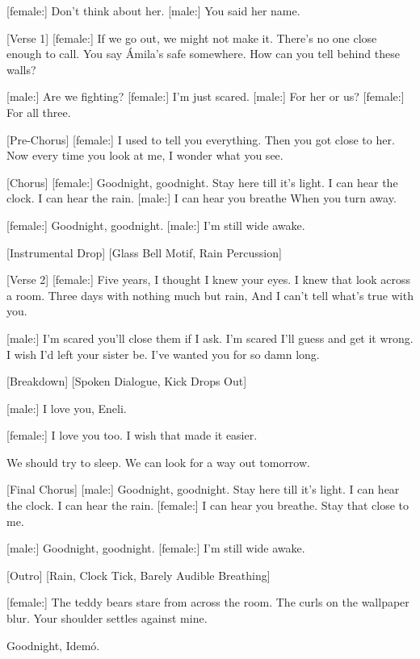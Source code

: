 \begin{lyrics}

[female:]
Don’t think about her.
[male:]
You said her name.

[Verse 1]
[female:]
If we go out, we might not make it.
There’s no one close enough to call.
You say Ámila’s safe somewhere.
How can you tell behind these walls?

[male:]
Are we fighting?
[female:]
I’m just scared.
[male:]
For her or us?
[female:]
For all three.

[Pre-Chorus]
[female:]
I used to tell you everything.
Then you got close to her.
Now every time you look at me,
I wonder what you see.

[Chorus]
[female:]
Goodnight, goodnight.
Stay here till it’s light.
I can hear the clock.
I can hear the rain.
[male:]
I can hear you breathe
When you turn away.

[female:]
Goodnight, goodnight.
[male:]
I’m still wide awake.

[Instrumental Drop]
[Glass Bell Motif, Rain Percussion]

[Verse 2]
[female:]
Five years, I thought I knew your eyes.
I knew that look across a room.
Three days with nothing much but rain,
And I can’t tell what’s true with you.

[male:]
I’m scared you’ll close them if I ask.
I’m scared I’ll guess and get it wrong.
I wish I’d left your sister be.
I’ve wanted you for so damn long.

[Breakdown]
[Spoken Dialogue, Kick Drops Out]

[male:]
I love you, Eneli.

[female:]
I love you too.
I wish that made it easier.

We should try to sleep.
We can look for a way out tomorrow.

[Final Chorus]
[male:]
Goodnight, goodnight.
Stay here till it’s light.
I can hear the clock.
I can hear the rain.
[female:]
I can hear you breathe.
Stay that close to me.

[male:]
Goodnight, goodnight.
[female:]
I’m still wide awake.

[Outro]
[Rain, Clock Tick, Barely Audible Breathing]

[female:]
The teddy bears stare from across the room.
The curls on the wallpaper blur.
Your shoulder settles against mine.

Goodnight, Idemó.
\end{lyrics}

